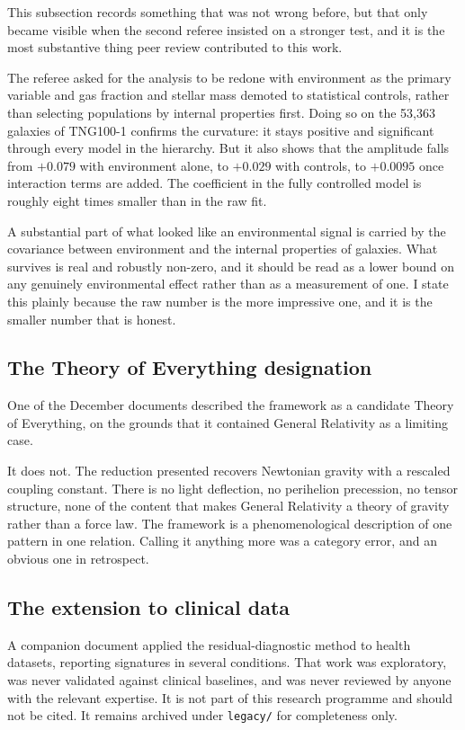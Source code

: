 \documentclass[12pt,a4paper]{article}
\begin{document}
This subsection records something that was not wrong before, but that only became visible when the second referee insisted on a stronger test, and it is the most substantive thing peer review contributed to this work.

The referee asked for the analysis to be redone with environment as the primary variable and gas fraction and stellar mass demoted to statistical controls, rather than selecting populations by internal properties first. Doing so on the 53{,}363 galaxies of TNG100-1 confirms the curvature: it stays positive and significant through every model in the hierarchy. But it also shows that the amplitude falls from $+0.079$ with environment alone, to $+0.029$ with controls, to $+0.0095$ once interaction terms are added. The coefficient in the fully controlled model is roughly eight times smaller than in the raw fit.

A substantial part of what looked like an environmental signal is carried by the covariance between environment and the internal properties of galaxies. What survives is real and robustly non-zero, and it should be read as a lower bound on any genuinely environmental effect rather than as a measurement of one. I state this plainly because the raw number is the more impressive one, and it is the smaller number that is honest.

\subsection{The Theory of Everything designation}

One of the December documents described the framework as a candidate Theory of Everything, on the grounds that it contained General Relativity as a limiting case.

It does not. The reduction presented recovers Newtonian gravity with a rescaled coupling constant. There is no light deflection, no perihelion precession, no tensor structure, none of the content that makes General Relativity a theory of gravity rather than a force law. The framework is a phenomenological description of one pattern in one relation. Calling it anything more was a category error, and an obvious one in retrospect.

\subsection{The extension to clinical data}

A companion document applied the residual-diagnostic method to health datasets, reporting signatures in several conditions. That work was exploratory, was never validated against clinical baselines, and was never reviewed by anyone with the relevant expertise. It is not part of this research programme and should not be cited. It remains archived under \texttt{legacy/} for completeness only.
\end{document}

